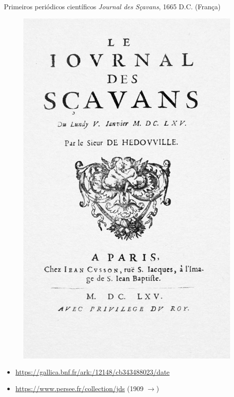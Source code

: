 \begin{frame}{Primeiros periódicos científicos}
\textit{Journal des Sçavans}, 1665 D.C. (França)
\begin{figure}
\centering
\includegraphics[scale=0.1]{figs/01/scavans}
\end{figure}
\begin{itemize}
\item \small{ \url{https://gallica.bnf.fr/ark:/12148/cb343488023/date} }
\item \small{ \url{https://www.persee.fr/collection/jds} (1909 $\rightarrow$) }
\end{itemize}
\end{frame}

